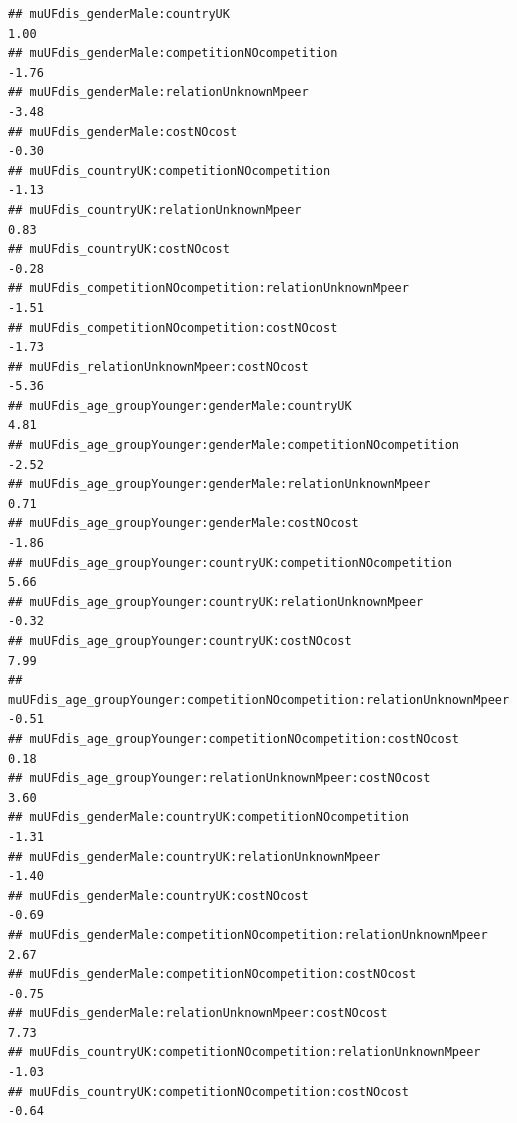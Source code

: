 \documentclass[
]{article}
\begin{document}
\begin{verbatim}
## muUFdis_genderMale:countryUK                                                          1.00
## muUFdis_genderMale:competitionNOcompetition                                          -1.76
## muUFdis_genderMale:relationUnknownMpeer                                              -3.48
## muUFdis_genderMale:costNOcost                                                        -0.30
## muUFdis_countryUK:competitionNOcompetition                                           -1.13
## muUFdis_countryUK:relationUnknownMpeer                                                0.83
## muUFdis_countryUK:costNOcost                                                         -0.28
## muUFdis_competitionNOcompetition:relationUnknownMpeer                                -1.51
## muUFdis_competitionNOcompetition:costNOcost                                          -1.73
## muUFdis_relationUnknownMpeer:costNOcost                                              -5.36
## muUFdis_age_groupYounger:genderMale:countryUK                                         4.81
## muUFdis_age_groupYounger:genderMale:competitionNOcompetition                         -2.52
## muUFdis_age_groupYounger:genderMale:relationUnknownMpeer                              0.71
## muUFdis_age_groupYounger:genderMale:costNOcost                                       -1.86
## muUFdis_age_groupYounger:countryUK:competitionNOcompetition                           5.66
## muUFdis_age_groupYounger:countryUK:relationUnknownMpeer                              -0.32
## muUFdis_age_groupYounger:countryUK:costNOcost                                         7.99
## muUFdis_age_groupYounger:competitionNOcompetition:relationUnknownMpeer               -0.51
## muUFdis_age_groupYounger:competitionNOcompetition:costNOcost                          0.18
## muUFdis_age_groupYounger:relationUnknownMpeer:costNOcost                              3.60
## muUFdis_genderMale:countryUK:competitionNOcompetition                                -1.31
## muUFdis_genderMale:countryUK:relationUnknownMpeer                                    -1.40
## muUFdis_genderMale:countryUK:costNOcost                                              -0.69
## muUFdis_genderMale:competitionNOcompetition:relationUnknownMpeer                      2.67
## muUFdis_genderMale:competitionNOcompetition:costNOcost                               -0.75
## muUFdis_genderMale:relationUnknownMpeer:costNOcost                                    7.73
## muUFdis_countryUK:competitionNOcompetition:relationUnknownMpeer                      -1.03
## muUFdis_countryUK:competitionNOcompetition:costNOcost                                -0.64

\end{verbatim}
\end{document}
